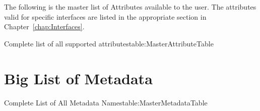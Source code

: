 The following is the master list of Attributes available to the user.
The attributes valid for specific interfaces are listed in the appropriate section in Chapter~\ref{chap:Interfaces}. 

\begin{attributetable}{Complete list of all supported attributes}{table:MasterAttributeTable}
\aPstateDesc
\aCstateDesc
\aCstateLimitDesc
\aSstateDesc
\aCurrentDesc
\aVoltageDesc
\aPowerDesc
\aMinPowerDesc
\aMaxPowerDesc
\aFreqDesc
\aFreqLimitMinDesc
\aFreqLimitMaxDesc
\aEnergyDesc
\aTempDesc
\aOSIdDesc
\aThrottledIdDesc
\aThrottledCountIdDesc
\aGovDesc
\end{attributetable}

\section{Big List of Metadata}\label{sec:BLOM}

\begin{attributetable}{Complete List of All Metadata Names}{table:MasterMetadataTable}
\mNum
\mMin
\mMax
\mPrecision
\mAccuracy
\mUpdateRate
\mSampleRate
\mTimeWindow
\mTSLatency
\mTSAccuracy
\mMaxLen
\mNameLen
\mName
\mDescLen
\mDesc
\mValueLen
\mVendorInfoLen
\mVendorInfo
\mMeasureMethod
\end{attributetable}


